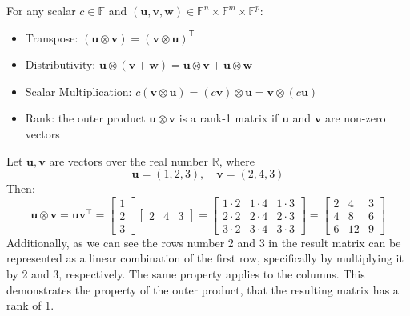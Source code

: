 \documentclass[../lecture-notes.tex]{subfiles}
\begin{document}
\begin{lemma}
    For any scalar $c \in \mathbb{F}$ and $(\mathbf{u}, \mathbf{v}, \mathbf{w}) \in \mathbb{F}^n \times \mathbb{F}^m \times \mathbb{F}^p$:
    \begin{itemize}
        \item Transpose: $(\mathbf{u} \otimes \mathbf{v}) = (\mathbf{v} \otimes \mathbf{u})^{\textsf{T}}$
        \item Distributivity: $\mathbf{u} \otimes (\mathbf{v} + \mathbf{w}) = \mathbf{u} \otimes \mathbf{v} + \mathbf{u} \otimes \mathbf{w}$
        \item Scalar Multiplication: $c(\mathbf{v} \otimes \mathbf{u}) = (c\mathbf{v}) \otimes \mathbf{u} = \mathbf{v} \otimes (c\mathbf{u})$
        \item Rank: the outer product $\mathbf{u} \otimes \mathbf{v}$ is a rank-1 matrix if $\mathbf{u}$ and $\mathbf{v}$ are non-zero
        vectors
    \end{itemize}
\end{lemma}

\begin{example}
    Let $\mathbf{u}, \mathbf{v}$ are vectors over the real number $\mathbb{R}$, where
    \begin{equation*}
        \mathbf{u} = (1, 2, 3), \quad \mathbf{v} = (2, 4, 3)
    \end{equation*}
    Then: 
    \begin{equation*}
        \mathbf{u} \otimes \mathbf{v} = \mathbf{u}\mathbf{v}^{\top} = \begin{bmatrix}
        1 \\ 2 \\ 3
        \end{bmatrix}\begin{bmatrix}
        2 & 4 & 3
        \end{bmatrix} = \begin{bmatrix}
            1 \cdot 2 & 1 \cdot 4 & 1 \cdot 3 \\
            2 \cdot 2 & 2 \cdot 4 & 2 \cdot 3 \\
            3 \cdot 2 & 3 \cdot 4 & 3 \cdot 3
        \end{bmatrix} = \begin{bmatrix}
            2 & 4 & 3 \\
            4 & 8 & 6 \\
            6 & 12 & 9
        \end{bmatrix}
    \end{equation*}
    Additionally, as we can see the rows number 2 and 3 in the result matrix can be represented
    as a linear combination of the first row, specifically by multiplying it by 2 and 3, 
    respectively. The same property applies to the columns. This demonstrates the property of the
    outer product, that the resulting matrix has a rank of 1.
\end{example}
\end{document}
